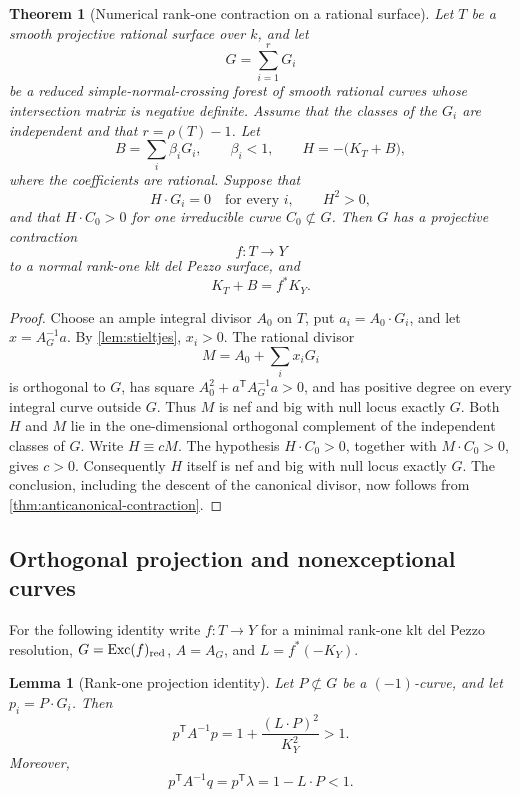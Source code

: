 \documentclass[11pt,reqno]{amsart}
\newtheorem{theorem}{Theorem}[section]
\newtheorem{lemma}[lemma]{Lemma}
\theoremstyle{definition}
\theoremstyle{remark}
\DeclareMathOperator{\Exc}{Exc}
\numberwithin{equation}{section}
\begin{document}
\begin{theorem}[Numerical rank-one contraction on a rational surface]\label{thm:numerical-contraction}
Let $T$ be a smooth projective rational surface over $k$, and let
\[
  G=\sum_{i=1}^rG_i
\]
be a reduced simple-normal-crossing forest of smooth rational curves whose intersection matrix is negative definite.  Assume that the classes of the $G_i$ are independent and that $r=\rho(T)-1$.  Let
\[
  B=\sum_i\beta_iG_i,
  \qquad \beta_i<1,
  \qquad H=-\bigl(K_T+B\bigr),
\]
where the coefficients are rational.  Suppose that
\[
  H\cdot G_i=0\quad\text{for every }i,
  \qquad H^2>0,
\]
and that $H\cdot C_0>0$ for one irreducible curve $C_0\not\subset G$.  Then $G$ has a projective contraction
\[
  f:T\longrightarrow Y
\]
to a normal rank-one klt del Pezzo surface, and
\[
  K_T+B=f^*K_Y.
\]
\end{theorem}

\begin{proof}
Choose an ample integral divisor $A_0$ on $T$, put
$a_i=A_0\cdot G_i$, and let $x=A_G^{-1}a$. By \cref{lem:stieltjes},
$x_i>0$. The rational divisor
\[
 M=A_0+\sum_i x_iG_i
\]
is orthogonal to $G$, has square $A_0^2+a^{\mathsf T}A_G^{-1}a>0$,
and has positive degree on every integral curve outside $G$.
Thus $M$ is nef and big with null locus exactly $G$.
Both $H$ and $M$ lie in the one-dimensional orthogonal complement
of the independent classes of $G$. Write $H\equiv cM$. The hypothesis
$H\cdot C_0>0$, together with $M\cdot C_0>0$, gives $c>0$.
Consequently $H$ itself is nef and big with null locus exactly $G$.
The conclusion, including the descent of the canonical divisor,
now follows from \cref{thm:anticanonical-contraction}.
\end{proof}

\subsection{Orthogonal projection and nonexceptional curves}

For the following identity write $f:T\to Y$ for a minimal
rank-one klt del Pezzo resolution, $G=\Exc(f)_{\rm red}$,
$A=A_G$, and $L=f^*(-K_Y)$.

\begin{lemma}[Rank-one projection identity]\label{lem:projection}
Let $P\not\subset G$ be a $(-1)$-curve, and let $p_i=P\cdot G_i$.  Then
\begin{equation}\label{eq:green}
  p^{\mathsf T}A^{-1}p
  =1+\frac{(L\cdot P)^2}{K_Y^2}>1.
\end{equation}
Moreover,
\begin{equation}\label{eq:green-charge}
  p^{\mathsf T}A^{-1}q=p^{\mathsf T}\lambda=1-L\cdot P<1.
\end{equation}
\end{lemma}
\end{document}
